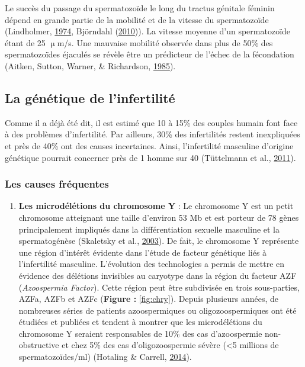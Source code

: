 \documentclass[12pt,twoside]{reedthesis}
\providecommand{\tightlist}{%
  \setlength{\itemsep}{0pt}\setlength{\parskip}{0pt}}
\theoremstyle{definition}
\theoremstyle{definition}
\theoremstyle{remark}
\begin{document}
  Le succès du passage du spermatozoïde le long du tractus génitale
  féminin dépend en grande partie de la mobilité et de la vitesse du
  spermatozoïde (Lindholmer, \protect\hyperlink{ref-Lindholmer1974}{1974},
  Björndahl (\protect\hyperlink{ref-Bjorndahl2010}{2010})). La vitesse
  moyenne d'un spermatozoïde étant de 25 \(\upmu\)m/s. Une mauvaise
  mobilité observée dans plus de 50\% des spermatozoïdes éjaculés se
  révèle être un prédicteur de l'échec de la fécondation (Aitken, Sutton,
  Warner, \& Richardson, \protect\hyperlink{ref-Aitken1985}{1985}).
  
  \subsection{La génétique de
  l'infertilité}\label{la-genetique-de-linfertilite}
  
  Comme il a déjà été dit, il est estimé que 10 à 15\% des couples humain
  font face à des problèmes d'infertilité. Par ailleurs, 30\% des
  infertilités restent inexpliquées et près de 40\% ont des causes
  incertaines. Ainsi, l'infertilité masculine d'origine génétique pourrait
  concerner près de 1 homme sur 40 (Tüttelmann et al.,
  \protect\hyperlink{ref-Tuttelmann2011}{2011}).
  
  \subsubsection{Les causes fréquentes}\label{les-causes-frequentes}
  
  \begin{enumerate}
  \def\labelenumi{\arabic{enumi}.}
  \tightlist
  \item
    \textbf{Les microdélétions du chromosome Y} : Le chromosome Y est un
    petit chromosome atteignant une taille d'environ 53 Mb et est porteur
    de 78 gènes principalement impliqués dans la différentiation sexuelle
    masculine et la spermatogénèse (Skaletsky et al.,
    \protect\hyperlink{ref-Skaletsky2003}{2003}). De fait, le chromosome Y
    représente une région d'intérêt évidente dans l'étude de facteur
    génétique liés à l'infertilité masculine. L'évolution des technologies
    a permis de mettre en évidence des délétions invisibles au caryotype
    dans la région du facteur AZF (\emph{Azoospermia Factor}). Cette
    région peut être subdivisée en trois sous-parties, AZFa, AZFb et AZFc
    (\textbf{Figure :} \ref{fig:chry}). Depuis plusieurs années, de
    nombreuses séries de patients azoospermiques ou oligozoospermiques ont
    été étudiées et publiées et tendent à montrer que les microdélétions
    du chromosome Y seraient responsables de 10\% des cas d'azoospermie
    non-obstructive et chez 5\% des cas d'oligozoospermie sévère
    (\textless{}5 millions de spermatozoïdes/ml) (Hotaling \& Carrell,
    \protect\hyperlink{ref-Hotaling2014}{2014}).
  \end{enumerate}
  
\end{document}

